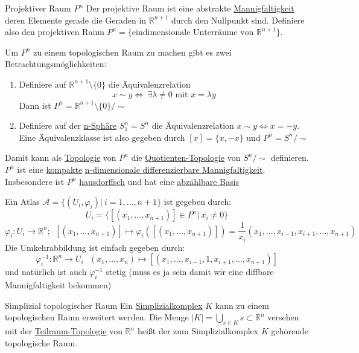\begin{titleDef}{Projektiver Raum $P^n$}
	\label{projRaum}
	Der projektive Raum ist eine abstrakte \hyperref[Mannigfaltigkeit]{Mannigfaltigkeit} deren Elemente gerade die Geraden in $\mathbb{R}^{n+1}$ durch den Nullpunkt sind. Definiere also den projektiven Raum $P^n=\{\text{eindimensionale Unterräume von }\mathbb{R}^{n+1}\}$.\par
	Um $P^n$ zu einem topologischen Raum zu machen gibt es zwei Betrachtungsmöglichkeiten:
	\begin{enumerate}[label=(\alph*)]
		\item Definiere auf $\mathbb{R}^{n+1}\setminus\{0\}$ die Äquivalenzrelation
		$$x\sim y\Longleftrightarrow\ \exists\lambda\neq0 \text{ mit }x= \lambda y$$
		Dann ist $P^n=\mathbb{R}^{n+1}\setminus\{0\}/\sim$
		\item Definiere auf der \hyperref[ndimsphere]{n-Sphäre} $S_1^n=S^n$ die Äquivalenzrelation ${x\sim y\Longleftrightarrow x=-y}$. Eine Äquivalenzklasse ist also gegeben durch $[x]=\{x,-x\}$ und $P^n=S^n/\sim$
	\end{enumerate}
Damit kann als \hyperref[Topologie]{Topologie} von $P^n$ die \hyperref[quotTopo]{Quotienten-Topologie} von $S^n/\sim$ definieren.\\
$P^n$ ist eine \hyperref[kompakt]{kompakte} \hyperref[diffMannigfaltigkeit]{n-dimensionale differenzierbare Mannigfaltigkeit}.\\
Insbesondere ist $P^n$ \hyperref[hausdorffsch]{hausdorffsch} und hat eine \hyperref[basisTopo]{abzählbare Basis}\par
Ein Atlas $\mathcal{A}=\{(U_i,\varphi_i)|\: i=1,\ldots,n+1\}$ ist gegeben durch:
$$U_i=\{[(x_1,\ldots,x_{n+1})]\in P^n|\ x_i\neq0\}$$
$$\varphi_i:U_i\to\mathbb{R}^n;\:\:[(x_1,\ldots,x_{n+1})]\mapsto\varphi_i([(x_1,\ldots,x_{n+1})])=\frac{1}{x_i}(x_1,\ldots,x_{i-1},x_{i+1},\ldots,x_{n+1})$$
Die Umkehrabbildung ist einfach gegeben durch:
$$\varphi_i^{-1}:\mathbb{R}^n\to U_i\:\:\:(x_1,\ldots,x_n)\mapsto[(x_1,\ldots,x_{i-1},1,x_{i+1},\ldots,x_{n+1})]$$
und natürlich ist auch $\varphi_i^{-1}$ stetig (muss es ja sein damit wir eine diffbare Mannigfaltigkeit bekommen)
\end{titleDef}

\begin{titleDef}{Simplizial topologischer Raum}
\label{simplexTopo}
Ein \hyperref[simplex]{Simplizialkomplex} $K$ kann zu einem topologischen Raum erweitert werden. Die Menge $\lvert K\rvert=\bigcup_{s\in K}s\subset\mathbb{R}^n$ versehen mit der \hyperref[teilraumTopo]{Teilraum-Topologie} von $\mathbb{R}^n$ heißt der zum Simplizialkomplex $K$ gehörende topologische Raum.
\end{titleDef}

